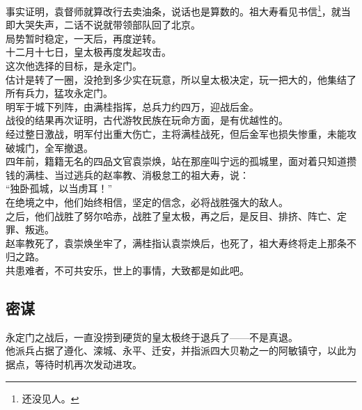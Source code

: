 \begin{multicols}{\theparacolNo}
事实证明，袁督师就算改行去卖油条，说话也是算数的。祖大寿看见书信\footnote{还没见人。}，就当即大哭失声，二话不说就带领部队回了北京。\\

局势暂时稳定，一天后，再度逆转。\\

十二月十七日，皇太极再度发起攻击。\\

这次他选择的目标，是永定门。\\

估计是转了一圈，没抢到多少实在玩意，所以皇太极决定，玩一把大的，他集结了所有兵力，猛攻永定门。\\

明军于城下列阵，由满桂指挥，总兵力约四万，迎战后金。\\

战役的结果再次证明，古代游牧民族在玩命方面，是有优越性的。\\

经过整日激战，明军付出重大伤亡，主将满桂战死，但后金军也损失惨重，未能攻破城门，全军撤退。\\

四年前，籍籍无名的四品文官袁崇焕，站在那座叫宁远的孤城里，面对着只知道攒钱的满桂、当过逃兵的赵率教、消极怠工的祖大寿，说：\\

“独卧孤城，以当虏耳！”\\

在绝境之中，他们始终相信，坚定的信念，必将战胜强大的敌人。\\

之后，他们战胜了努尔哈赤，战胜了皇太极，再之后，是反目、排挤、阵亡、定罪、叛逃。\\

赵率教死了，袁崇焕坐牢了，满桂指认袁崇焕后，也死了，祖大寿终将走上那条不归之路。\\

共患难者，不可共安乐，世上的事情，大致都是如此吧。\\

\subsection{密谋}
永定门之战后，一直没捞到硬货的皇太极终于退兵了——不是真退。\\

他派兵占据了遵化、滦城、永平、迁安，并指派四大贝勒之一的阿敏镇守，以此为据点，等待时机再次发动进攻。\\


\end{multicols}
